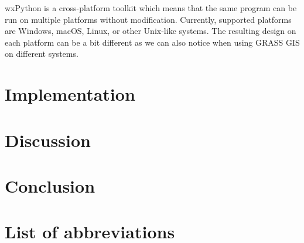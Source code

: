 \documentclass[a4paper,10pt,twoside]{article}
\begin{document}
wxPython is a cross-platform toolkit which means that the same program can be run on multiple platforms without modification. Currently, supported platforms are Windows, macOS, Linux, or other Unix-like systems. The resulting design on each platform can be a bit different as we can also notice when using GRASS GIS on different systems. 


\newpage
\vspace*{-1cm}
\section{Implementation}
\noindent
\large

\newpage
\vspace*{-1cm}
\section*{Discussion}
\noindent
\large

\newpage
\vspace*{-1cm}
\section*{Conclusion}
\noindent
\large

\newpage
\vspace*{-1cm}
\section*{List of abbreviations}
\noindent
\large


\newpage
\vspace*{-6ex}
\renewcommand{\refname}{Bibliography} 
	
	
\end{document}
